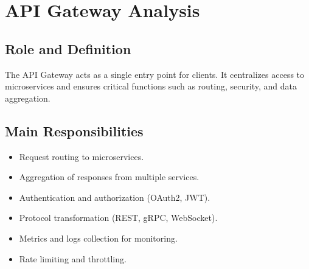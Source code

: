 \documentclass[a4paper,11pt]{article}
\begin{document}
\begin{adjustbox}{max width=\textwidth, center}
\end{adjustbox}

\newpage
\section{API Gateway Analysis}

\subsection*{Role and Definition}
The API Gateway acts as a single entry point for clients.  
It centralizes access to microservices and ensures critical functions such as routing, security, and data aggregation.

\subsection*{Main Responsibilities}
\begin{itemize}
    \item Request routing to microservices.
    \item Aggregation of responses from multiple services.
    \item Authentication and authorization (OAuth2, JWT).
    \item Protocol transformation (REST, gRPC, WebSocket).
    \item Metrics and logs collection for monitoring.
    \item Rate limiting and throttling.
\end{itemize}
\end{document}
